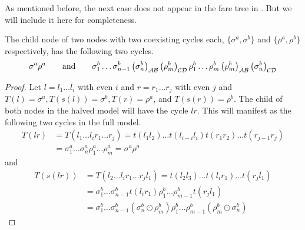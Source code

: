 As mentioned before, the next case does not appear in the fare tree in .
But we will include it here for completeness.

\begin{theorem}
	The child node of two nodes with two coexisting cycles each, $\{\sigma^a, \sigma^b\}$ and $\{\rho^a, \rho^b\}$ respectively, has the following two cycles.
	\begin{align*}
		\sigma^a\rho^a \qquad \text{and} \qquad
		\sigma^b_1 \dots \sigma^b_{n-1} \left(\sigma^b_n\right)_{\mathcal{A}\mathcal{B}} \left(\rho^b_m\right)_{\mathcal{C}\mathcal{D}} \rho^b_1 \dots \rho^b_m \left(\rho^b_m\right)_{\mathcal{A}\mathcal{B}} \left(\sigma^b_n\right)_{\mathcal{C}\mathcal{D}}
	\end{align*}
\end{theorem}

\begin{proof}
	Let $l = l_1 \dots l_i$ with even $i$ and $r = r_1 \dots r_j$ with even $j$ and $T(l) = \sigma^a, T(s(l)) = \sigma^b, T(r) = \rho^a$, and $T(s(r)) = \rho^b$.
	The child of both nodes in the halved model will have the cycle $lr$.
	This will manifest as the following two cycles in the full model.
	\begin{align*}
		T(lr) & = T(l_1 \dots l_i r_1 \dots r_j) = t(l_1l_2) \dots t(l_{i-i}l_i) t(r_1r_2) \dots t(r_{j-1}r_j) \\
		      & = \sigma^a_1 \dots \sigma^a_n \rho^a_1 \dots \rho^a_m = \sigma^a\rho^a
	\end{align*}
	and
	\begin{align*}
		T(s(lr)) & = T(l_2 \dots l_i r_1 \dots r_j l_1) = t(l_2l_3) \dots t(l_ir_1) \dots t(r_jl_1)  \\
		         & = \sigma^b_1 \dots \sigma^b_{n-1} t(l_ir_1) \rho^b_1 \dots \rho^b_{m-1} t(r_jl_1) \\
		         & = \sigma^b_1 \dots \sigma^b_{n-1} \left(\sigma^b_n \odot \rho^b_m\right)
		\rho^b_1 \dots \rho^b_{m-1} \left(\rho^b_m \odot \sigma^b_n\right)
	\end{align*}
\end{proof}